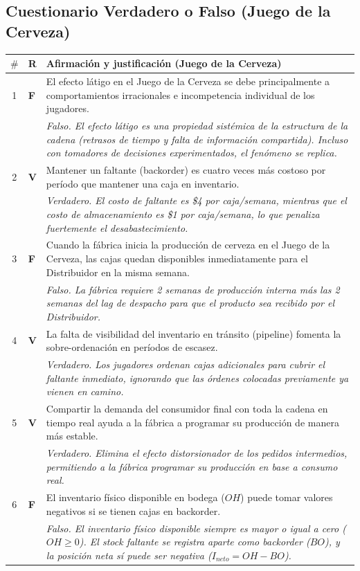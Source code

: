 \subsection[V/F Juego de Cerveza]{Cuestionario Verdadero o Falso (Juego de la Cerveza)}

\begin{center}
\small
\begin{tabular}{@{}clp{11cm}@{}}
  \toprule
  $\#$ & R & Afirmación y justificación (Juego de la Cerveza) \\
  \midrule
  1 & \textbf{F} & El efecto látigo en el Juego de la Cerveza se debe principalmente a comportamientos irracionales e incompetencia individual de los jugadores. \\
    &            & \textit{Falso. El efecto látigo es una propiedad sistémica de la estructura de la cadena (retrasos de tiempo y falta de información compartida). Incluso con tomadores de decisiones experimentados, el fenómeno se replica.} \\
  2 & \textbf{V} & Mantener un faltante (backorder) es cuatro veces más costoso por período que mantener una caja en inventario. \\
    &            & \textit{Verdadero. El costo de faltante es \$4 por caja/semana, mientras que el costo de almacenamiento es \$1 por caja/semana, lo que penaliza fuertemente el desabastecimiento.} \\
  3 & \textbf{F} & Cuando la fábrica inicia la producción de cerveza en el Juego de la Cerveza, las cajas quedan disponibles inmediatamente para el Distribuidor en la misma semana. \\
    &            & \textit{Falso. La fábrica requiere 2 semanas de producción interna más las 2 semanas del lag de despacho para que el producto sea recibido por el Distribuidor.} \\
  4 & \textbf{V} & La falta de visibilidad del inventario en tránsito (pipeline) fomenta la sobre-ordenación en períodos de escasez. \\
    &            & \textit{Verdadero. Los jugadores ordenan cajas adicionales para cubrir el faltante inmediato, ignorando que las órdenes colocadas previamente ya vienen en camino.} \\
  5 & \textbf{V} & Compartir la demanda del consumidor final con toda la cadena en tiempo real ayuda a la fábrica a programar su producción de manera más estable. \\
    &            & \textit{Verdadero. Elimina el efecto distorsionador de los pedidos intermedios, permitiendo a la fábrica programar su producción en base a consumo real.} \\
  6 & \textbf{F} & El inventario físico disponible en bodega ($OH$) puede tomar valores negativos si se tienen cajas en backorder. \\
    &            & \textit{Falso. El inventario físico disponible siempre es mayor o igual a cero ($OH \ge 0$). El stock faltante se registra aparte como backorder ($BO$), y la posición neta sí puede ser negativa ($I_{neto} = OH - BO$).} \\
  \bottomrule
\end{tabular}
\end{center}

